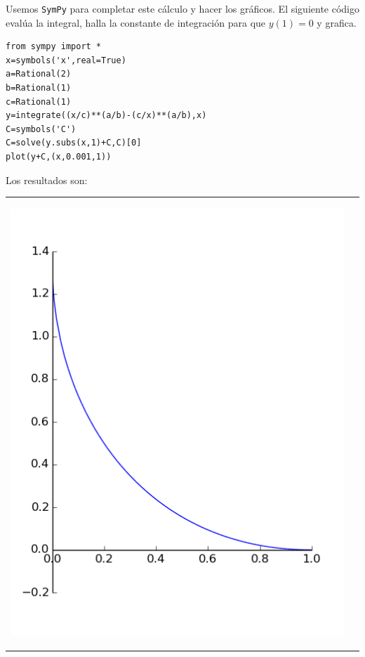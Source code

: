 Usemos \texttt{SymPy} para completar este cálculo y hacer los gráficos. El siguiente código evalúa la integral, halla la constante de integración para que $y(1)=0$ y grafica.

\begin{lstlisting}
from sympy import *
x=symbols('x',real=True)
a=Rational(2)
b=Rational(1)
c=Rational(1)
y=integrate((x/c)**(a/b)-(c/x)**(a/b),x)
C=symbols('C')
C=solve(y.subs(x,1)+C,C)[0]
plot(y+C,(x,0.001,1))
\end{lstlisting}

Los resultados son:

\begin{tabular}{m{5cm} m{5cm}}
\begin{center}
\includegraphics[scale=.3]{imagenes/perse_a_1_b_2.png}


\end{center}
\end{tabular}
